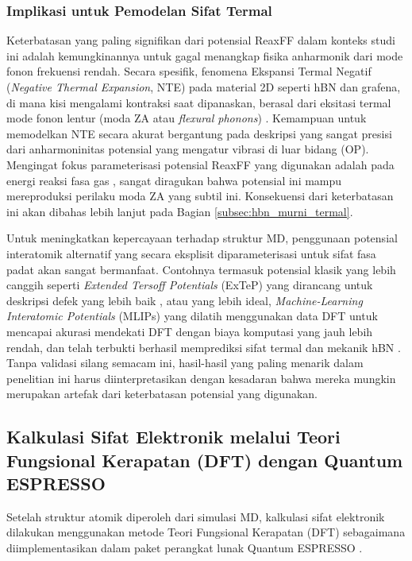 \subsubsection{Implikasi untuk Pemodelan Sifat Termal}
Keterbatasan yang paling signifikan dari potensial ReaxFF dalam konteks studi ini adalah kemungkinannya untuk gagal menangkap fisika anharmonik dari mode fonon frekuensi rendah. Secara spesifik, fenomena Ekspansi Termal Negatif (\textit{Negative Thermal Expansion}, NTE) pada material 2D seperti hBN dan grafena, di mana kisi mengalami kontraksi saat dipanaskan, berasal dari eksitasi termal mode fonon lentur (moda ZA atau \textit{flexural phonons}) \citep{Sarikurt2022}. Kemampuan untuk memodelkan NTE secara akurat bergantung pada deskripsi yang sangat presisi dari anharmoninitas potensial yang mengatur vibrasi di luar bidang (OP). Mengingat fokus parameterisasi potensial ReaxFF yang digunakan adalah pada energi reaksi fasa gas \citep{Lele2022}, sangat diragukan bahwa potensial ini mampu mereproduksi perilaku moda ZA yang subtil ini. Konsekuensi dari keterbatasan ini akan dibahas lebih lanjut pada Bagian \ref{subsec:hbn_murni_termal}.

Untuk meningkatkan kepercayaan terhadap struktur MD, penggunaan potensial interatomik alternatif yang secara eksplisit diparameterisasi untuk sifat fasa padat akan sangat bermanfaat. Contohnya termasuk potensial klasik yang lebih canggih seperti \textit{Extended Tersoff Potentials} (ExTeP) yang dirancang untuk deskripsi defek yang lebih baik \citep{Los2017}, atau yang lebih ideal, \textit{Machine-Learning Interatomic Potentials} (MLIPs) yang dilatih menggunakan data DFT untuk mencapai akurasi mendekati DFT dengan biaya komputasi yang jauh lebih rendah, dan telah terbukti berhasil memprediksi sifat termal dan mekanik hBN \citep{NietoLuna2025, Choyal2024}. Tanpa validasi silang semacam ini, hasil-hasil yang paling menarik dalam penelitian ini harus diinterpretasikan dengan kesadaran bahwa mereka mungkin merupakan artefak dari keterbatasan potensial yang digunakan.

\subsection{Kalkulasi Sifat Elektronik melalui Teori Fungsional Kerapatan (DFT) dengan Quantum ESPRESSO}
\label{subsec:dft_qe}
Setelah struktur atomik diperoleh dari simulasi MD, kalkulasi sifat elektronik dilakukan menggunakan metode Teori Fungsional Kerapatan (DFT) \citep{Hohenberg1964, Kohn1965} sebagaimana diimplementasikan dalam paket perangkat lunak Quantum ESPRESSO \citep{Giannozzi2009, Giannozzi2017}.

